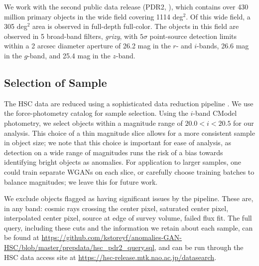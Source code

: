 We work with the second public data release (PDR2, \citealt{Aihara2019}), which contains over 430 million primary objects in the wide field covering 1114 deg$^2$. 
Of this wide field, a 305 deg$^2$ area is observed in full-depth full-color.
The objects in this field are observed in 5 broad-band filters, \textit{grizy}, with $5\sigma$ point-source detection limits within a 2 arcsec diameter aperture of 26.2 mag in the $r$- and $i$-bands, 26.6 mag in the $g$-band, and 25.4 mag in the $z$-band. 


\subsection{Selection of Sample} 

The HSC data are reduced using a sophisticated data reduction pipeline \citep{Bosch2019}.
We use the force-photometry catalog for sample selection. 
Using the $i$-band CModel photometry, we select objects within a magnitude range of $20.0 < i < 20.5$ for our analysis. 
This choice of a thin magnitude slice allows for a more consistent sample in object size; we note that this choice is important for ease of analysis, as detection on a wide range of magnitudes runs the risk of a bias towards identifying bright objects as anomalies.
For application to larger samples, one could train separate WGANs on each slice, or carefully choose training batches to balance magnitudes; we leave this for future work.

We exclude objects flagged as having significant issues by the pipeline. 
These are, in any band: cosmic rays crossing the center pixel, saturated center pixel, interpolated center pixel, source at edge of survey volume, failed flux fit.
The full query, including these cuts and the information we retain about each sample, can be found at \url{https://github.com/kstoreyf/anomalies-GAN-HSC/blob/master/prepdata/hsc_pdr2_query.sql}, and can be run through the HSC data access site at \url{https://hsc-release.mtk.nao.ac.jp/datasearch}.

